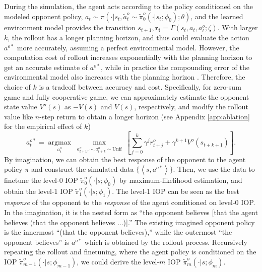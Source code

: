 \documentclass{article}
\begin{document}
During the simulation, the agent acts according to the policy conditioned on the modeled opponent policy, $a_t \sim\pi(\cdot |s_t, \tilde{a}_t^o \sim \tilde{\pi}^o_0(\cdot|s_t;\phi_0);\theta)$, and the learned environment model provides the transition $s_{t+1},\bm{r_t} = \Gamma(s_t, a_t, a_t^o;\zeta)$. With larger $k$, the rollout has a longer planning horizon, and thus could evaluate the action $a^{o*}$ more accurately, assuming a perfect environmental model. However, the computation cost of rollout increases exponentially with the planning horizon to get an accurate estimate of $a^{o*}$, while in practice the compounding error of the environmental model also increases with the planning horizon \citep{janner2019trust}. Therefore, the choice of $k$ is a tradeoff between accuracy and cost. Specifically, for zero-sum game and fully cooperative game, we can approximately estimate the opponent state value $V^o(s)$ as $-V(s)$ and $V(s)$, respectively, and modify the rollout value like $n$-step return \citep{sutton2018reinforcement} to obtain a longer horizon (see Appendix \ref{app:ablation} for the empirical effect of $k$)
\begin{equation}
\label{eq:best_1}
a^{o *}_t = \mathop{\operatorname{argmax}}\limits_{a_t^{o}}\max\limits_{\substack{a_{t+1}^o,\cdots, a_{t+k}^o \sim \text{Unif}}} \left[ \sum_{j = 0}^{k}\gamma^{j} {r}_{t+j}^{o} + \gamma^{k+1} V^o(s_{t+k+1}) \right].
\end{equation}
By imagination, we can obtain the best response of the opponent to the agent policy $\pi$ and construct the simulated data $\{\left<s, a^{o*}\right>\}$. Then, we use the data to finetune the level-0 IOP $\tilde{\pi}^o_0(\cdot|s;\phi_0)$ by maximum-likelihood estimation, and obtain the level-1 IOP $\tilde{\pi}^o_1(\cdot|s;\phi_1)$. The level-1 IOP can be seen as the best \textit{response} of the opponent to the \textit{response} of the agent conditioned on level-0 IOP. In the imagination, it is the nested form as ``the opponent believes [that the agent believes (that the opponent believes ...)].'' The existing imagined opponent policy is the innermost ``(that the opponent believes),'' while the outermost ``the opponent believes'' is $a^{o*}$ which is obtained by the rollout process. Recursively repeating the rollout and finetuning, where the agent policy is conditioned on the IOP $\tilde{\pi}^o_{m-1}(\cdot|s;\phi_{m-1})$, we could derive the level-$m$ IOP $\tilde{\pi}^o_m(\cdot|s;\phi_m)$. %
\end{document}

